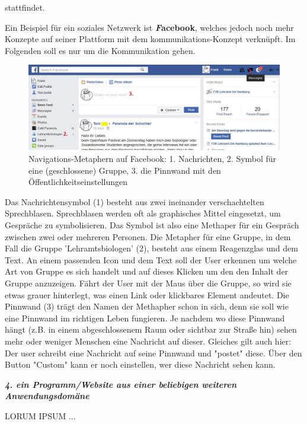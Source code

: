 \documentclass[a4paper,10pt]{article}
\begin{document}
stattfindet. \newline

Ein Beispiel für ein soziales Netzwerk ist \textbf{\textit Facebook}, welches jedoch noch mehr Konzepte auf seiner Plattform mit dem kommunikations-Konzept verknüpft. Im Folgenden soll es nur um die Kommunikation gehen.

\begin{figure}[ht]
\centering \includegraphics[width=1\textwidth]{facebook.jpg}
\caption{Navigations-Metaphern auf Facebook: 1. Nachrichten, 2. Symbol für eine (geschlossene) Gruppe, 3. die Pinnwand mit den Öffentlichkeitseinstellungen}
\end{figure}

Das Nachrichtensymbol (1) besteht aus zwei ineinander verschachtelten Sprechblasen. Sprechblasen werden oft als graphisches Mittel eingesetzt, um Gespräche zu symbolisieren. Das Symbol ist also eine Methaper für ein Gespräch zwischen zwei oder mehreren Personen. \newline
Die Metapher für eine Gruppe, in dem Fall die Gruppe 'Lehramtsbiologen' (2), besteht aus einem Reagenzglas und dem Text. An einem passenden Icon und dem Text soll der User erkennen um welche Art von Gruppe es sich handelt und auf dieses Klicken um den den Inhalt der Gruppe anzuzeigen. Fährt der User mit der Maus über die Gruppe, so wird sie etwas grauer hinterlegt, was einen Link oder klickbares Element andeutet. \newline
Die Pinnwand (3) trägt den Namen der Methapher schon in sich, denn sie soll wie eine Pinnwand im richtigen Leben fungieren. Je nachdem wo diese Pinnwand hängt (z.B. in einem abgeschlossenem Raum oder sichtbar zur Straße hin) sehen mehr oder weniger Menschen eine Nachricht auf dieser. Gleiches gilt auch hier: Der user schreibt eine Nachricht auf seine Pinnwand und "postet" diese. Über den Button "Custom" kann er noch einstellen, wer diese Nachricht sehen kann. \newline


\textbf{\textit{4. ein Programm/Website aus einer beliebigen weiteren Anwendungsdomäne}} \newline

LORUM IPSUM ... \newline
\end{document}
